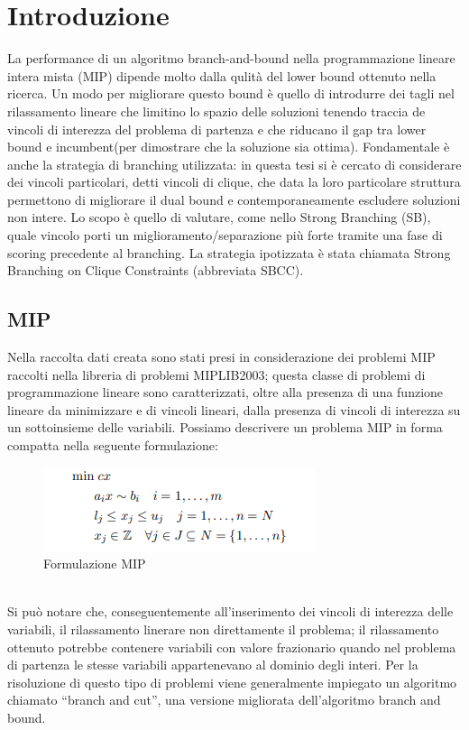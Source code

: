 \documentclass[12pt,a4paper,twoside,openright]{book}
\begin{document}
\mainmatter

\chapter{Introduzione}
La performance di un algoritmo branch-and-bound nella programmazione lineare intera mista (MIP)
dipende molto dalla qulità del lower bound ottenuto nella ricerca. Un modo per migliorare questo bound
è quello di introdurre dei tagli nel rilassamento lineare che limitino lo spazio delle soluzioni tenendo traccia
de vincoli di interezza del problema di partenza e che riducano il gap tra lower bound e incumbent(per dimostrare che la soluzione sia ottima).
Fondamentale è anche la strategia di branching utilizzata: in questa tesi si è cercato di considerare dei vincoli particolari, detti vincoli di clique,
che data la loro particolare struttura permettono di migliorare il dual bound e contemporaneamente escludere 
soluzioni non intere. Lo scopo è quello di valutare, come nello Strong Branching (SB), quale vincolo porti un 
miglioramento/separazione più forte tramite una fase di scoring precedente al branching. La strategia
ipotizzata è stata chiamata Strong Branching on Clique Constraints (abbreviata SBCC).

\section{MIP}
Nella raccolta dati creata sono stati presi in considerazione dei problemi
MIP raccolti nella libreria di problemi MIPLIB2003; questa classe di problemi
di programmazione lineare sono caratterizzati, oltre alla presenza di una funzione
lineare da minimizzare e di vincoli lineari, dalla presenza di vincoli di interezza
su un sottoinsieme delle variabili. Possiamo descrivere un problema MIP in forma compatta
nella seguente formulazione: \pagebreak
\begin{figure}[ht]
    \centering
    \includegraphics [scale = 0.7]{mip_scheme.png}
    \caption{ Formulazione MIP }
    \label{fig:mip}
\end{figure}
\\
Si può notare che, conseguentemente all’inserimento dei vincoli di interezza delle variabili,
il rilassamento linerare non direttamente il problema; il rilassamento ottenuto potrebbe contenere variabili con valore frazionario
quando nel problema di partenza le stesse variabili appartenevano al dominio degli interi.
Per la risoluzione di questo tipo di problemi viene generalmente impiegato un algoritmo 
chiamato “branch and cut”, una versione migliorata dell’algoritmo branch and bound.
\end{document}
